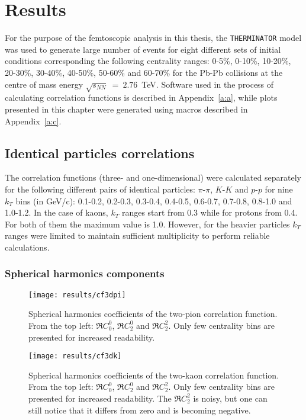 \chapter{Results}
  For the purpose of the femtoscopic analysis in this thesis, the \verb|THERMINATOR| model was used to generate large number of events for eight different sets of initial conditions corresponding the following centrality ranges: 0-5\%, 0-10\%, 10-20\%, 20-30\%, 30-40\%, 40-50\%, 50-60\% and 60-70\% for the Pb-Pb collisions at the centre of mass energy $\sqrt{s_{NN}}~=~2.76$~TeV.
  Software used in the process of calculating correlation functions is described in Appendix~\ref{a:a}, while plots presented in this chapter were generated using macros described in Appendix~\ref{a:c}.
  \section{Identical particles correlations}
    The correlation functions (three- and one-dimensional) were calculated separately for the following different pairs of identical particles: $\pi$-$\pi$, $K$-$K$ and  $p$-$p$ for nine $k_T$ bins (in GeV/c): 0.1-0.2, 0.2-0.3, 0.3-0.4, 0.4-0.5, 0.6-0.7, 0.7-0.8, 0.8-1.0 and 1.0-1.2.
    In the case of kaons, $k_T$ ranges start from 0.3 while for protons from 0.4.
    For both of them the maximum value is 1.0.
    However, for the heavier particles $k_T$ ranges were limited to maintain sufficient multiplicity to perform reliable calculations.
    \subsection{Spherical harmonics components}

      \begin{figure}[b]
        \centering
        \centerline{\texttt{[image: results/cf3dpi]}}
        \caption{Spherical harmonics coefficients of the two-pion correlation function. From the top left: $\Re C^0_0$, $\Re C^0_2$ and $\Re C^2_2$. Only few centrality bins are presented for increased readability.}
      \label{fig:cf3dpi}
      \end{figure}

      \begin{figure}[b]
        \centering
        \centerline{\texttt{[image: results/cf3dk]}}
        \caption{Spherical harmonics coefficients of the two-kaon correlation function. From the top left: $\Re C^0_0$, $\Re C^0_2$ and $\Re C^2_2$. Only few centrality bins are presented for increased readability. The $\Re C^2_2$ is noisy, but one can still notice that it differs from zero and is becoming negative.}
      \label{fig:cf3dk}
      \end{figure} 


